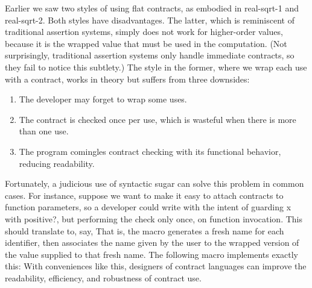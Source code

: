 
Earlier we saw two styles of using flat contracts, as embodied in real-sqrt-1
and real-sqrt-2. Both styles have disadvantages. The latter, which is
reminiscent of traditional assertion systems, simply does not work for
higher-order values, because it is the wrapped value that must be used in the
computation. (Not surprisingly, traditional assertion systems only handle
immediate contracts, so they fail to notice this subtlety.) The style in the
former, where we wrap each use with a contract, works in theory but suffers from
three downsides:
\begin{enumerate}[nosep]
  \item 
The developer may forget to wrap some uses.
  \item 
The contract is checked once per use, which is wasteful when there is more than
one use.
  \item 
The program comingles contract checking with its functional behavior, reducing
readability.
\end{enumerate}
Fortunately, a judicious use of syntactic sugar can solve this problem in common
cases. For instance, suppose we want to make it easy to attach contracts to
function parameters, so a developer could write
with the intent of guarding x with positive?, but performing the check only
once, on function invocation. This should translate to, say,
That is, the macro generates a fresh name for each identifier, then associates
the name given by the user to the wrapped version of the value supplied to that
fresh name. The following macro implements exactly this:
With conveniences like this, designers of contract languages can improve the
readability, efficiency, and robustness of contract use.
